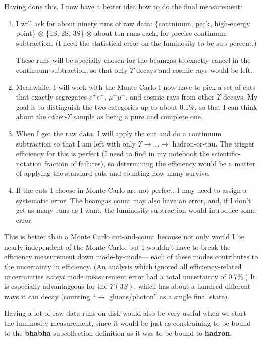 \documentclass{article}
\begin{document}
\pagebreak
Having done this, I now have a better idea how to do the final
measurement:
\begin{enumerate}

  \item I will ask for about ninety runs of raw data: \{contniuum,
  peak, high-energy point\} $\otimes$ \{1S, 2S, 3S\} $\otimes$ about
  ten runs each, for precise continuum subtraction.  (I need the
  statistical error on the luminosity to be sub-percent.)

  These runs will be specially chosen for the beamgas to exactly
  cancel in the continuum subtraction, so that only $\Upsilon$ decays
  and cosmic rays would be left.

  \item Meanwhile, I will work with the Monte Carlo I now have to pick
  a set of cuts that exactly segregates $e^+e^-$, $\mu^+\mu^-$, and
  cosmic rays from other $\Upsilon$ decays.  My goal is to distinguish
  the two categories up to about 0.1\%, so that I can think about the
  other-$\Upsilon$ sample as being a pure and complete one.

  \item When I get the raw data, I will apply the cut and do a
  continuum subtraction so that I am left with only $\Upsilon \to
  \ldots \to$ hadron-or-tau.  The trigger efficiency for this is
  perfect (I need to find in my notebook the scientific-notation
  fraction of failures), so determining the efficiency would be a
  matter of applying the standard cuts and counting how many survive.

  \item If the cuts I choose in Monte Carlo are not perfect, I may
  need to assign a systematic error.  The beamgas count may also have
  an error, and, if I don't get as many runs as I want, the luminosity
  subtraction would introduce some error.

\end{enumerate}

This is better than a Monte Carlo cut-and-count because not only would
I be nearly independent of the Monte Carlo, but I wouldn't have to
break the efficiency measurement down mode-by-mode--- each of these
modes contributes to the uncertainty in efficiency.  (An analysis
which ignored all efficiency-related uncertainties {\it except} mode
measurement error had a total uncertainty of 0.7\%.)  It is especially
advantageous for the $\Upsilon(3S)$, which has about a hundred
different ways it can decay (counting ``$\to$ gluons/photon'' as a
single final state).

Having a lot of raw data runs on disk would also be very useful when
we start the luminosity measurement, since it would be just as
constraining to be bound to the {\bf bhabha} subcollection definition
as it was to be bound to {\bf hadron}.
\end{document}
